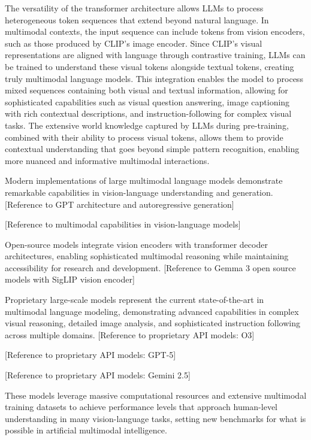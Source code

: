 The versatility of the transformer architecture allows LLMs to process heterogeneous token sequences that extend beyond natural language. In multimodal contexts, the input sequence can include tokens from vision encoders, such as those produced by CLIP's image encoder. Since CLIP's visual representations are aligned with language through contrastive training, LLMs can be trained to understand these visual tokens alongside textual tokens, creating truly multimodal language models. This integration enables the model to process mixed sequences containing both visual and textual information, allowing for sophisticated capabilities such as visual question answering, image captioning with rich contextual descriptions, and instruction-following for complex visual tasks. The extensive world knowledge captured by LLMs during pre-training, combined with their ability to process visual tokens, allows them to provide contextual understanding that goes beyond simple pattern recognition, enabling more nuanced and informative multimodal interactions.

Modern implementations of large multimodal language models demonstrate remarkable capabilities in vision-language understanding and generation. [Reference to GPT architecture and autoregressive generation] %

[Reference to multimodal capabilities in vision-language models] %

Open-source models integrate vision encoders with transformer decoder architectures, enabling sophisticated multimodal reasoning while maintaining accessibility for research and development. [Reference to Gemma 3 open source models with SigLIP vision encoder] %

Proprietary large-scale models represent the current state-of-the-art in multimodal language modeling, demonstrating advanced capabilities in complex visual reasoning, detailed image analysis, and sophisticated instruction following across multiple domains. [Reference to proprietary API models: O3] %

[Reference to proprietary API models: GPT-5] %

[Reference to proprietary API models: Gemini 2.5] %

These models leverage massive computational resources and extensive multimodal training datasets to achieve performance levels that approach human-level understanding in many vision-language tasks, setting new benchmarks for what is possible in artificial multimodal intelligence.

